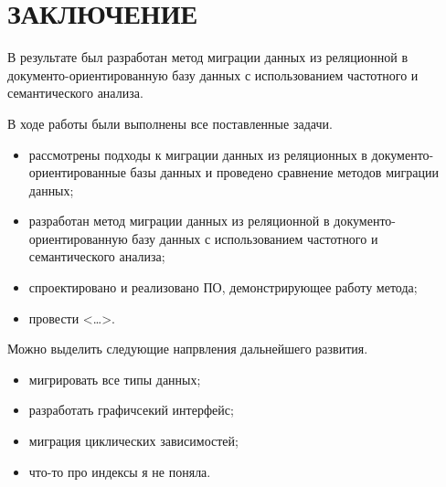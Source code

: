 \chapter*{ЗАКЛЮЧЕНИЕ}

В результате был разработан метод миграции данных из реляционной в
документо-ориентированную базу данных с
использованием частотного и семантического
анализа.

В ходе работы были выполнены все поставленные задачи.
\begin{itemize}[label=---]
    \item рассмотрены подходы к миграции данных из реляционных в документо-ориентированные
    базы данных и проведено сравнение методов миграции данных;
    \item разработан метод миграции данных из реляционной в документо-ориентированную базу данных с
    использованием частотного и семантического анализа;
    \item спроектировано и реализовано ПО, демонстрирующее работу метода;
    \item провести <\dots>.
\end{itemize}

Можно выделить следующие напрвления дальнейшего развития.
\begin{itemize}[label=---]
    \item мигрировать все типы данных;
    \item разработать графичсекий интерфейс;
    \item миграция циклических зависимостей;
    \item что-то про индексы я не поняла.
\end{itemize}


